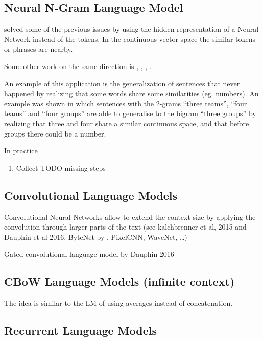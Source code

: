\documentclass[b5paper]{report}
\begin{document}
\subsection{Neural N-Gram Language Model}

\cite{bengio2003neural} solved some of the previous issues by using the
hidden representation of a Neural Network instead of the tokens. In the
continuous vector space the similar tokens or phrases are nearby.

Some other work on the same direction is \cite{mikolov2013distributed},
, \cite{pennington2014glove}, \cite{le2014distributed}.

An example of this application is the generalization of sentences that never
happened by realizing that some words share some similarities (eg. numbers). An
example was shown in which sentences with the 2-grams ``three teams'', ``four
teams'' and ``four groups'' are able to generalise to the bigram ``three
groups'' by realizing that three and four share a similar continuous space, and
that before groups there could be a number.

In practice

\begin{enumerate}
  \item Collect TODO missing steps
\end{enumerate}

\subsection{Convolutional Language Models}

Convolutional Neural Networks allow to extend the context size by applying the
convolution through larger parts of the text (see kalchbrenner et al, 2015 and
Dauphin et al 2016, ByteNet by \cite{kalchbrenner2016neural}, PixelCNN,
WaveNet, \dots)

Gated convolutional language model by Dauphin 2016 \cite{dauphin2016language}


\subsection{CBoW Language Models (infinite context)}

The idea is similar to the LM of using averages instead of concatenation.

\subsection{Recurrent Language Models}
\end{document}
